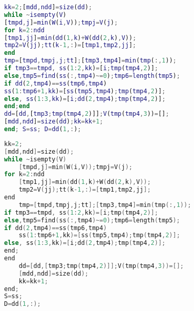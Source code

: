 \documentclass{swmcmthesis}
\begin{document}
\begin{lstlisting}[language=matlab,caption={The matlab Source code of Algorithm}]
kk=2;[mdd,ndd]=size(dd);
while ~isempty(V)
[tmpd,j]=min(W(i,V));tmpj=V(j);
for k=2:ndd
[tmp1,jj]=min(dd(1,k)+W(dd(2,k),V));
tmp2=V(jj);tt(k-1,:)=[tmp1,tmp2,jj];
end
tmp=[tmpd,tmpj,j;tt];[tmp3,tmp4]=min(tmp(:,1));
if tmp3==tmpd, ss(1:2,kk)=[i;tmp(tmp4,2)];
else,tmp5=find(ss(:,tmp4)~=0);tmp6=length(tmp5);
if dd(2,tmp4)==ss(tmp6,tmp4)
ss(1:tmp6+1,kk)=[ss(tmp5,tmp4);tmp(tmp4,2)];
else, ss(1:3,kk)=[i;dd(2,tmp4);tmp(tmp4,2)];
end;end
dd=[dd,[tmp3;tmp(tmp4,2)]];V(tmp(tmp4,3))=[];
[mdd,ndd]=size(dd);kk=kk+1;
end; S=ss; D=dd(1,:);
 \end{lstlisting}
\begin{lstlisting}[language=c,caption={The lingo source code}]
kk=2;
[mdd,ndd]=size(dd);
while ~isempty(V)
    [tmpd,j]=min(W(i,V));tmpj=V(j);
for k=2:ndd
    [tmp1,jj]=min(dd(1,k)+W(dd(2,k),V));
    tmp2=V(jj);tt(k-1,:)=[tmp1,tmp2,jj];
end
    tmp=[tmpd,tmpj,j;tt];[tmp3,tmp4]=min(tmp(:,1));
if tmp3==tmpd, ss(1:2,kk)=[i;tmp(tmp4,2)];
else,tmp5=find(ss(:,tmp4)~=0);tmp6=length(tmp5);
if dd(2,tmp4)==ss(tmp6,tmp4)
    ss(1:tmp6+1,kk)=[ss(tmp5,tmp4);tmp(tmp4,2)];
else, ss(1:3,kk)=[i;dd(2,tmp4);tmp(tmp4,2)];
end;
end
    dd=[dd,[tmp3;tmp(tmp4,2)]];V(tmp(tmp4,3))=[];
    [mdd,ndd]=size(dd);
    kk=kk+1;
end;
S=ss;
D=dd(1,:);
 \end{lstlisting}


%
\end{document}
